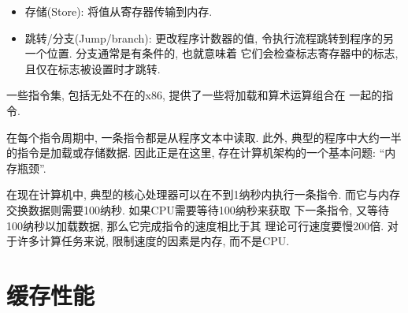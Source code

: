 \documentclass[12pt]{book}
\begin{document}
{\begin{itemize}
\item 存储(Store): 将值从寄存器传输到内存. 

\item 跳转/分支(Jump/branch): 更改程序计数器的值, 
令执行流程跳转到程序的另一个位置. 分支通常是有条件的, 也就意味着
它们会检查标志寄存器中的标志, 且仅在标志被设置时才跳转.

\end{itemize}

一些指令集, 包括无处不在的x86, 提供了一些将加载和算术运算组合在
一起的指令.

在每个指令周期中, 一条指令都是从程序文本中读取.
此外, 典型的程序中大约一半的指令是加载或存储数据.
因此正是在这里, 存在计算机架构的一个基本问题: ``内存瓶颈''.

在现在计算机中, 典型的核心处理器可以在不到1纳秒内执行一条指令.
而它与内存交换数据则需要100纳秒. 如果CPU需要等待100纳秒来获取
下一条指令, 又等待100纳秒以加载数据, 那么它完成指令的速度相比于其
理论可行速度要慢200倍. 对于许多计算任务来说, 限制速度的因素是内存,
 而不是CPU.

\section{缓存性能}

}
\end{document}

